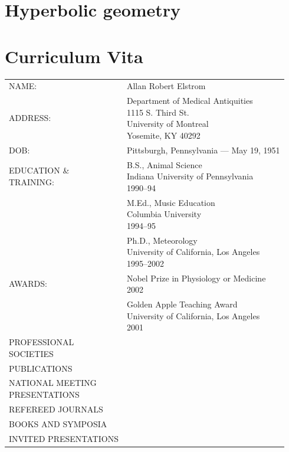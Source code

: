 \documentclass{uoflthesis} %
\begin{document}
\nocite{*}



\appendix

\chapter{Hyperbolic geometry}

\lipsum

\chapter*{Curriculum Vita}

\singlespacing
\renewcommand{\arraystretch}{2}

\begin{tabular}{ll}
NAME: & Allan Robert Elstrom\\
ADDRESS: & \makecell[lt]{Department of Medical Antiquities\\1115 S. Third St.\\University of Montreal\\Yosemite, KY 40292}\\
DOB: & Pittsburgh, Pennsylvania --- May 19, 1951\\
\makecell[lb]{EDUCATION \&\\ TRAINING:} & \makecell[lt]{B.S., Animal Science\\Indiana University of Pennsylvania\\1990--94}\\
    &\makecell[lt]{M.Ed., Music Education\\Columbia University\\1994--95}\\
    &\makecell[lt]{Ph.D., Meteorology\\University of California, Los Angeles\\1995--2002}\\
AWARDS: & \makecell[lt]{Nobel Prize in Physiology or Medicine\\2002}\\
    &\makecell[lt]{Golden Apple Teaching Award\\University of California, Los Angeles\\2001}\\
\makecell[lb]{PROFESSIONAL\\SOCIETIES}\\
PUBLICATIONS\\
\makecell[lb]{NATIONAL MEETING\\PRESENTATIONS}\\
REFEREED JOURNALS\\
BOOKS AND SYMPOSIA\\
INVITED PRESENTATIONS\\
\end{tabular}
\end{document}
